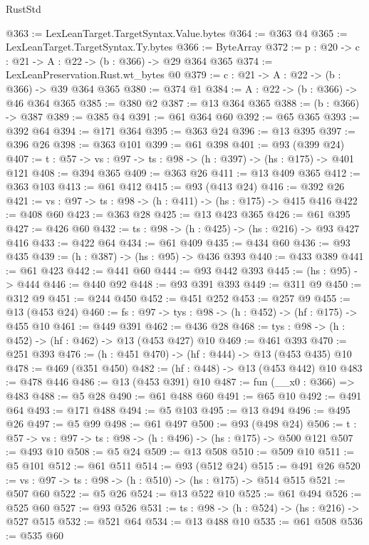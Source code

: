 \begin{lexlean}{RustStd}
\begin{coremodule}
@363 := LexLeanTarget.TargetSyntax.Value.bytes
@364 := @363 @4
@365 := LexLeanTarget.TargetSyntax.Ty.bytes
@366 := ByteArray
@372 := {p : @20} -> {c : @21} -> {A : @22} -> (b : @366) -> @29 @364 @365
@374 := LexLeanPreservation.Rust.wt_bytes @0
@379 := {c : @21} -> {A : @22} -> (b : @366) -> @39 @364 @365
@380 := @374 @1
@384 := {A : @22} -> (b : @366) -> @46 @364 @365
@385 := @380 @2
@387 := @13 @364 @365
@388 := (b : @366) -> @387
@389 := @385 @4
@391 := @61 @364 @60
@392 := @65 @365
@393 := @392 @64
@394 := @171 @364
@395 := @363 @24
@396 := @13 @395
@397 := @396 @26
@398 := @363 @101
@399 := @61 @398
@401 := @93 (@399 @24)
@407 := {t : @57} -> {vs : @97} -> {ts : @98} -> (h : @397) -> (hs : @175) -> @401 @121
@408 := @394 @365
@409 := @363 @26
@411 := @13 @409 @365
@412 := @363 @103
@413 := @61 @412
@415 := @93 (@413 @24)
@416 := @392 @26
@421 := {vs : @97} -> {ts : @98} -> (h : @411) -> (hs : @175) -> @415 @416
@422 := @408 @60
@423 := @363 @28
@425 := @13 @423 @365
@426 := @61 @395
@427 := @426 @60
@432 := {ts : @98} -> (h : @425) -> (hs : @216) -> @93 @427 @416
@433 := @422 @64
@434 := @61 @409
@435 := @434 @60
@436 := @93 @435
@439 := (h : @387) -> (hs : @95) -> @436 @393
@440 := @433 @389
@441 := @61 @423
@442 := @441 @60
@444 := @93 @442 @393
@445 := (hs : @95) -> @444
@446 := @440 @92
@448 := @93 @391 @393
@449 := @311 @9
@450 := @312 @9
@451 := @244 @450
@452 := @451 @252
@453 := @257 @9
@455 := @13 (@453 @24)
@460 := {fs : @97} -> {tys : @98} -> (h : @452) -> (hf : @175) -> @455 @10
@461 := @449 @391
@462 := @436 @28
@468 := {tys : @98} -> (h : @452) -> (hf : @462) -> @13 (@453 @427) @10
@469 := @461 @393
@470 := @251 @393
@476 := (h : @451 @470) -> (hf : @444) -> @13 (@453 @435) @10
@478 := @469 (@351 @450)
@482 := (hf : @448) -> @13 (@453 @442) @10
@483 := @478 @446
@486 := @13 (@453 @391) @10
@487 := fun (__x0 : @366) => @483
@488 := @5 @28
@490 := @61 @488 @60
@491 := @65 @10
@492 := @491 @64
@493 := @171 @488
@494 := @5 @103
@495 := @13 @494
@496 := @495 @26
@497 := @5 @99
@498 := @61 @497
@500 := @93 (@498 @24)
@506 := {t : @57} -> {vs : @97} -> {ts : @98} -> (h : @496) -> (hs : @175) -> @500 @121
@507 := @493 @10
@508 := @5 @24
@509 := @13 @508
@510 := @509 @10
@511 := @5 @101
@512 := @61 @511
@514 := @93 (@512 @24)
@515 := @491 @26
@520 := {vs : @97} -> {ts : @98} -> (h : @510) -> (hs : @175) -> @514 @515
@521 := @507 @60
@522 := @5 @26
@524 := @13 @522 @10
@525 := @61 @494
@526 := @525 @60
@527 := @93 @526
@531 := {ts : @98} -> (h : @524) -> (hs : @216) -> @527 @515
@532 := @521 @64
@534 := @13 @488 @10
@535 := @61 @508
@536 := @535 @60

\end{coremodule}
\end{lexlean}
